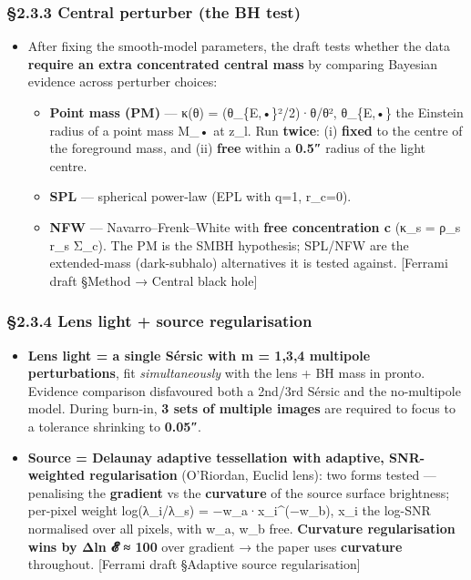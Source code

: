 \documentclass[
]{article}
\providecommand{\tightlist}{%
  \setlength{\itemsep}{0pt}\setlength{\parskip}{0pt}}
\newcommand{\BreakablePath}[1]{{\ttfamily\sloppy #1}}
\begin{document}
\hypertarget{central-perturber-the-bh-test}{%
\subsubsection{§2.3.3 Central perturber (the BH
test)}\label{central-perturber-the-bh-test}}

\begin{itemize}
\tightlist
\item
  After fixing the smooth-model parameters, the draft tests whether the
  data \textbf{require an extra concentrated central mass} by comparing
  Bayesian evidence across perturber choices:

  \begin{itemize}
  \tightlist
  \item
    \textbf{Point mass (PM)} --- κ(θ) =
    (θ\_\{E,•\}²/2)·θ/\textbar θ\textbar², θ\_\{E,•\} the Einstein
    radius of a point mass M\_• at z\_l. Run \textbf{twice}: (i)
    \textbf{fixed} to the centre of the foreground mass, and (ii)
    \textbf{free} within a \textbf{0.5″} radius of the light centre.
  \item
    \textbf{SPL} --- spherical power-law (EPL with q=1, r\_c=0).
  \item
    \textbf{NFW} --- Navarro--Frenk--White with \textbf{free
    concentration c} (κ\_s = ρ\_s r\_s Σ\_c). The PM is the SMBH
    hypothesis; SPL/NFW are the extended-mass (dark-subhalo)
    alternatives it is tested against. {[}Ferrami draft §Method →
    Central black hole{]}
  \end{itemize}
\end{itemize}

\hypertarget{lens-light-source-regularisation}{%
\subsubsection{§2.3.4 Lens light + source
regularisation}\label{lens-light-source-regularisation}}

\begin{itemize}
\tightlist
\item
  \textbf{Lens light = a single Sérsic with m = 1,3,4 multipole
  perturbations}, fit \emph{simultaneously} with the lens + BH mass in
  \BreakablePath{pronto}. Evidence comparison disfavoured both a 2nd/3rd
  Sérsic and the no-multipole model. During burn-in, \textbf{3 sets of
  multiple images} are required to focus to a tolerance shrinking to
  \textbf{0.05″}.
\item
  \textbf{Source = Delaunay adaptive tessellation with adaptive,
  SNR-weighted regularisation} (O'Riordan, Euclid lens): two forms
  tested --- penalising the \textbf{gradient} vs the \textbf{curvature}
  of the source surface brightness; per-pixel weight log(λ\_i/λ\_s) =
  −w\_a·x\_i\^{}(−w\_b), x\_i the log-SNR normalised over all pixels,
  with w\_a, w\_b free. \textbf{Curvature regularisation wins by Δln 𝓔 ≈
  100} over gradient → the paper uses \textbf{curvature} throughout.
  {[}Ferrami draft §Adaptive source regularisation{]}
\end{itemize}
\end{document}
